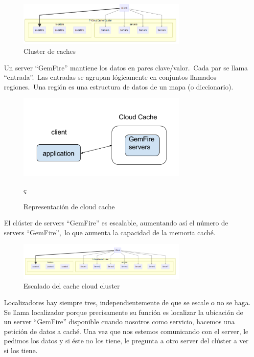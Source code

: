 \documentclass[a4paper,11pt]{article}
\begin{document}
\begin{figure}[h]
    \centering
    \includegraphics[width=0.75\textwidth]{fran2_3.png}
    \caption{Cluster de caches}
    \label{fig:fran2_3}
\end{figure}
Un server ``GemFire''   mantiene los datos en pares clave/valor. Cada par se llama ``entrada''. Las entradas se agrupan lógicamente en conjuntos llamados regiones. Una región es una estructura de datos de un mapa (o diccionario).
\begin{figure}[h]
    \centering
    \includegraphics[width=0.75\textwidth]{fran2_4.png}
    \caption{Representación de cloud cache}
    \label{fig:fran2_4}ç
\end{figure}
El clúster de servers ``GemFire'' es escalable, aumentando así el número de servers ``GemFire'', lo que aumenta la capacidad de la memoria caché. 
\begin{figure}[h]
    \centering
    \includegraphics[width=0.75\textwidth]{fran2_5.png}
    \caption{Escalado del cache cloud cluster}
    \label{fig:fran2_5}
\end{figure}
Localizadores hay siempre tres, independientemente de que se escale o no se haga. Se llama localizador porque precisamente su función es localizar la ubicación de un server “GemFire” disponible cuando nosotros como servicio, hacemos una petición de datos a caché. Una vez que nos estemos comunicando con el server, le pedimos los datos y si éste no los tiene, le pregunta a otro server del clúster a ver si los tiene.
\end{document}
